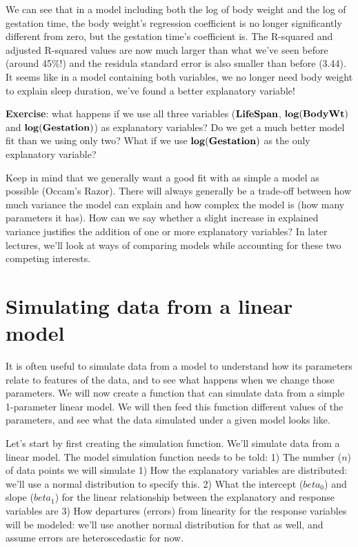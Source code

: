 \documentclass[
]{book}
\begin{document}
We can see that in a model including both the log of body weight and the log of gestation time, the body weight's regression coefficient is no longer significantly different from zero, but the gestation time's coefficient is. The R-squared and adjusted R-squared values are now much larger than what we've seen before (around 45\%!) and the residula standard error is also smaller than before (3.44). It seems like in a model containing both variables, we no longer need body weight to explain sleep duration, we've found a better explanatory variable!

\textbf{Exercise}: what happens if we use all three variables (\(\bf{LifeSpan}\), \(\bf{log(BodyWt)}\) and \(\bf{log(Gestation)}\)) as explanatory variables? Do we get a much better model fit than we using only two? What if we use \(\bf{log(Gestation)}\) as the only explanatory variable?

Keep in mind that we generally want a good fit with as simple a model as possible (Occam's Razor). There will always generally be a trade-off between how much variance the model can explain and how complex the model is (how many parameters it has). How can we say whether a slight increase in explained variance justifies the addition of one or more explanatory variables? In later lectures, we'll look at ways of comparing models while accounting for these two competing interests.

\hypertarget{simulating-data-from-a-linear-model}{%
\section{Simulating data from a linear model}\label{simulating-data-from-a-linear-model}}

It is often useful to simulate data from a model to understand how its parameters relate to features of the data, and to see what happens when we change those parameters. We will now create a function that can simulate data from a simple 1-parameter linear model. We will then feed this function different values of the parameters, and see what the data simulated under a given model looks like.

Let's start by first creating the simulation function. We'll simulate data from a linear model. The model simulation function needs to be told:
1) The number (\(n\)) of data points we will simulate
1) How the explanatory variables are distributed: we'll use a normal distribution to specify this.
2) What the intercept (\(beta_0\)) and slope (\(beta_1\)) for the linear relationship between the explanatory and response variables are
3) How departures (errors) from linearity for the response variables will be modeled: we'll use another normal distribution for that as well, and assume errors are heteroscedastic for now.
\end{document}
